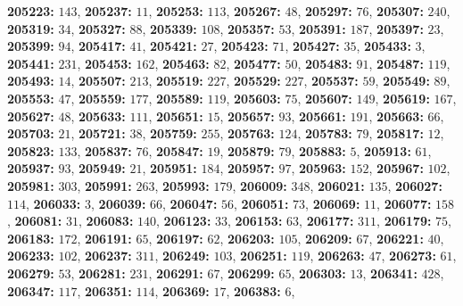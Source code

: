 \textsf{\bfseries 205223:} $143$, \textsf{\bfseries 205237:} $11$, \textsf{\bfseries 205253:} $113$, \textsf{\bfseries 205267:} $48$, \textsf{\bfseries 205297:} $76$, \textsf{\bfseries 205307:} $240$, \textsf{\bfseries 205319:} $34$, \textsf{\bfseries 205327:} $88$, \textsf{\bfseries 205339:} $108$, \textsf{\bfseries 205357:} $53$, \textsf{\bfseries 205391:} $187$, \textsf{\bfseries 205397:} $23$, \textsf{\bfseries 205399:} $94$, \textsf{\bfseries 205417:} $41$, \textsf{\bfseries 205421:} $27$, \textsf{\bfseries 205423:} $71$, \textsf{\bfseries 205427:} $35$, \textsf{\bfseries 205433:} $3$, \textsf{\bfseries 205441:} $231$, \textsf{\bfseries 205453:} $162$, \textsf{\bfseries 205463:} $82$, \textsf{\bfseries 205477:} $50$, \textsf{\bfseries 205483:} $91$, \textsf{\bfseries 205487:} $119$, \textsf{\bfseries 205493:} $14$, \textsf{\bfseries 205507:} $213$, \textsf{\bfseries 205519:} $227$, \textsf{\bfseries 205529:} $227$, \textsf{\bfseries 205537:} $59$, \textsf{\bfseries 205549:} $89$, \textsf{\bfseries 205553:} $47$, \textsf{\bfseries 205559:} $177$, \textsf{\bfseries 205589:} $119$, \textsf{\bfseries 205603:} $75$, \textsf{\bfseries 205607:} $149$, \textsf{\bfseries 205619:} $167$, \textsf{\bfseries 205627:} $48$, \textsf{\bfseries 205633:} $111$, \textsf{\bfseries 205651:} $15$, \textsf{\bfseries 205657:} $93$, \textsf{\bfseries 205661:} $191$, \textsf{\bfseries 205663:} $66$, \textsf{\bfseries 205703:} $21$, \textsf{\bfseries 205721:} $38$, \textsf{\bfseries 205759:} $255$, \textsf{\bfseries 205763:} $124$, \textsf{\bfseries 205783:} $79$, \textsf{\bfseries 205817:} $12$, \textsf{\bfseries 205823:} $133$, \textsf{\bfseries 205837:} $76$, \textsf{\bfseries 205847:} $19$, \textsf{\bfseries 205879:} $79$, \textsf{\bfseries 205883:} $5$, \textsf{\bfseries 205913:} $61$, \textsf{\bfseries 205937:} $93$, \textsf{\bfseries 205949:} $21$, \textsf{\bfseries 205951:} $184$, \textsf{\bfseries 205957:} $97$, \textsf{\bfseries 205963:} $152$, \textsf{\bfseries 205967:} $102$, \textsf{\bfseries 205981:} $303$, \textsf{\bfseries 205991:} $263$, \textsf{\bfseries 205993:} $179$, \textsf{\bfseries 206009:} $348$, \textsf{\bfseries 206021:} $135$, \textsf{\bfseries 206027:} $114$, \textsf{\bfseries 206033:} $3$, \textsf{\bfseries 206039:} $66$, \textsf{\bfseries 206047:} $56$, \textsf{\bfseries 206051:} $73$, \textsf{\bfseries 206069:} $11$, \textsf{\bfseries 206077:} $158$, \textsf{\bfseries 206081:} $31$, \textsf{\bfseries 206083:} $140$, \textsf{\bfseries 206123:} $33$, \textsf{\bfseries 206153:} $63$, \textsf{\bfseries 206177:} $311$, \textsf{\bfseries 206179:} $75$, \textsf{\bfseries 206183:} $172$, \textsf{\bfseries 206191:} $65$, \textsf{\bfseries 206197:} $62$, \textsf{\bfseries 206203:} $105$, \textsf{\bfseries 206209:} $67$, \textsf{\bfseries 206221:} $40$, \textsf{\bfseries 206233:} $102$, \textsf{\bfseries 206237:} $311$, \textsf{\bfseries 206249:} $103$, \textsf{\bfseries 206251:} $119$, \textsf{\bfseries 206263:} $47$, \textsf{\bfseries 206273:} $61$, \textsf{\bfseries 206279:} $53$, \textsf{\bfseries 206281:} $231$, \textsf{\bfseries 206291:} $67$, \textsf{\bfseries 206299:} $65$, \textsf{\bfseries 206303:} $13$, \textsf{\bfseries 206341:} $428$, \textsf{\bfseries 206347:} $117$, \textsf{\bfseries 206351:} $114$, \textsf{\bfseries 206369:} $17$, \textsf{\bfseries 206383:} $6$, 
